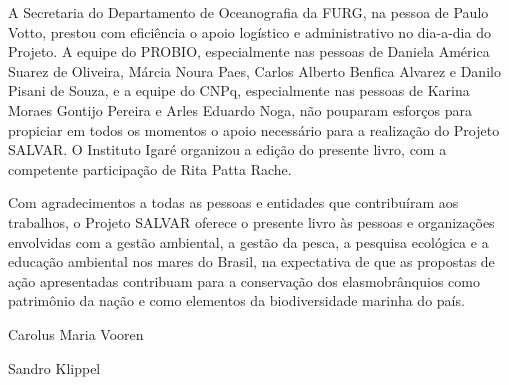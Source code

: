 \documentclass[a4paper,11pt,twoside,showtrims,onecolumn,openright,final]{memoir}
\begin{document}
A Secretaria do Departamento de Oceanografia da FURG, na pessoa de Paulo Votto, prestou 
com eficiência o apoio logístico e administrativo no dia-a-dia do Projeto.  
A equipe do PROBIO, especialmente nas pessoas de Daniela América Suarez de Oliveira, 
Márcia Noura Paes, Carlos Alberto Benfica Alvarez e Danilo Pisani de Souza, 
e a equipe do CNPq, especialmente nas pessoas de Karina Moraes Gontijo Pereira 
e Arles Eduardo Noga, não pouparam esforços para propiciar em todos 
os momentos o apoio necessário para a realização do Projeto SALVAR. 
O Instituto Igaré organizou a edição do presente livro, 
com a competente participação de Rita Patta Rache.

Com agradecimentos a todas as pessoas e entidades que contribuíram aos trabalhos, 
o Projeto SALVAR oferece o presente livro às pessoas e organizações envolvidas com 
a gestão ambiental, a gestão da pesca, a pesquisa ecológica e a educação ambiental 
nos mares do Brasil,  na expectativa de que as propostas de ação apresentadas 
contribuam para a conservação dos elasmobrânquios como patrimônio da nação e como 
elementos da biodiversidade marinha do país.

\begin{flushright}
\vspace{1cm}

Carolus Maria Vooren

\vspace{0.2cm}

Sandro Klippel 
\end{flushright}


%

\cleartorecto
\thispagestyle{empty}


\tableofcontents*

\thispagestyle{plain}
\end{document}
